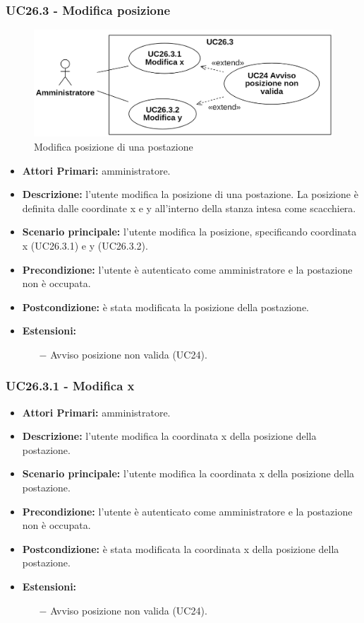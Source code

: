 \subsubsection{ UC26.3 - Modifica posizione}
\begin{figure}[H]
	\centering
	\includegraphics[width=12cm]{res/images/UC26.3.png}
	\caption{Modifica posizione di una postazione}
\end{figure}
\begin{itemize}
	\item\textbf{Attori Primari:}
	amministratore.
	\item\textbf{Descrizione:}
	l'utente modifica la posizione di una postazione. La posizione è definita dalle coordinate x e y all'interno della stanza intesa come scacchiera.
	\item\textbf{Scenario principale:} 
	l'utente modifica la posizione, specificando coordinata x (UC26.3.1) e y (UC26.3.2).
	\item\textbf{Precondizione:} 
	l'utente è autenticato come amministratore e la postazione non è occupata.
	\item\textbf{Postcondizione:}
	è stata modificata la posizione della postazione.
	\item\textbf{Estensioni:}
	\begin{itemize}
		\item[$-$] Avviso posizione non valida (UC24).
	\end{itemize}
\end{itemize}

\subsubsection{ UC26.3.1 - Modifica x}
\begin{itemize}
	\item\textbf{Attori Primari:}
	amministratore.
	\item\textbf{Descrizione:}
	l'utente modifica la coordinata x della posizione della postazione.
	\item\textbf{Scenario principale:} 
	l'utente modifica la coordinata x della posizione della postazione.
	\item\textbf{Precondizione:} 
	l'utente è autenticato come amministratore e la postazione non è occupata.
	\item\textbf{Postcondizione:}
	è stata modificata la coordinata x della posizione della postazione.
	\item\textbf{Estensioni:}
	\begin{itemize}
		\item[$-$] Avviso posizione non valida (UC24).
	\end{itemize}
\end{itemize}

